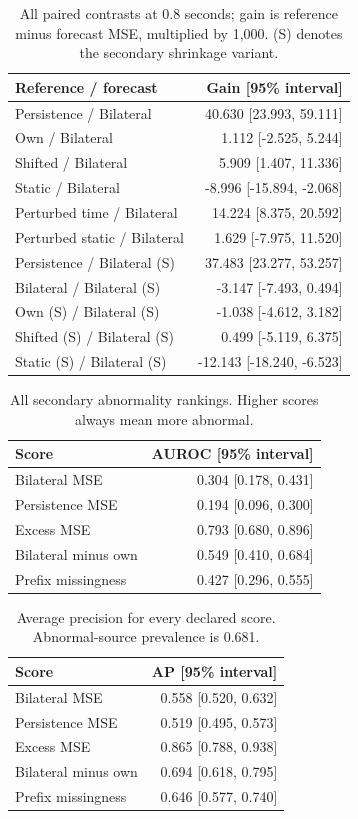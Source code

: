 \documentclass[letterpaper]{article}
\begin{document}
\begin{table}[t]
\centering
\small
\begin{tabular}{lr}
\toprule
Reference / forecast & Gain [95\% interval] \\
\midrule
Persistence / Bilateral & 40.630 [23.993, 59.111] \\
Own / Bilateral & 1.112 [-2.525, 5.244] \\
Shifted / Bilateral & 5.909 [1.407, 11.336] \\
Static / Bilateral & -8.996 [-15.894, -2.068] \\
Perturbed time / Bilateral & 14.224 [8.375, 20.592] \\
Perturbed static / Bilateral & 1.629 [-7.975, 11.520] \\
Persistence / Bilateral (S) & 37.483 [23.277, 53.257] \\
Bilateral / Bilateral (S) & -3.147 [-7.493, 0.494] \\
Own (S) / Bilateral (S) & -1.038 [-4.612, 3.182] \\
Shifted (S) / Bilateral (S) & 0.499 [-5.119, 6.375] \\
Static (S) / Bilateral (S) & -12.143 [-18.240, -6.523] \\
\bottomrule
\end{tabular}
\caption{All paired contrasts at 0.8 seconds; gain is reference minus forecast MSE, multiplied by 1,000. (S) denotes the secondary shrinkage variant.}
\end{table}

\begin{table}[t]
\centering
\small
\begin{tabular}{lr}
\toprule
Score & AUROC [95\% interval] \\
\midrule
Bilateral MSE & 0.304 [0.178, 0.431] \\
Persistence MSE & 0.194 [0.096, 0.300] \\
Excess MSE & 0.793 [0.680, 0.896] \\
Bilateral minus own & 0.549 [0.410, 0.684] \\
Prefix missingness & 0.427 [0.296, 0.555] \\
\bottomrule
\end{tabular}
\caption{All secondary abnormality rankings. Higher scores always mean more abnormal.}
\end{table}

\begin{table}[t]
\centering
\small
\begin{tabular}{lr}
\toprule
Score & AP [95\% interval] \\
\midrule
Bilateral MSE & 0.558 [0.520, 0.632] \\
Persistence MSE & 0.519 [0.495, 0.573] \\
Excess MSE & 0.865 [0.788, 0.938] \\
Bilateral minus own & 0.694 [0.618, 0.795] \\
Prefix missingness & 0.646 [0.577, 0.740] \\
\bottomrule
\end{tabular}
\caption{Average precision for every declared score. Abnormal-source prevalence is 0.681.}
\end{table}
\end{document}
